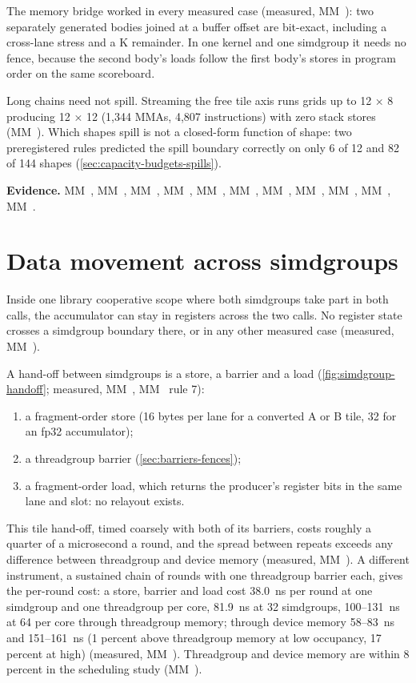 The memory bridge worked in every measured case (measured, MM~): two separately generated bodies joined at a
buffer offset are bit-exact, including a cross-lane stress and a K remainder. In one kernel and one simdgroup it needs
no fence, because the second body's loads follow the first body's stores in program order on the same scoreboard.

Long chains need not spill. Streaming the free tile axis runs grids up to 12 × 8 producing 12 × 12 (1,344 MMAs, 4,807
instructions) with zero stack stores (MM~). Which shapes spill is not a closed-form function of shape: two
preregistered rules predicted the spill boundary correctly on only 6 of 12 and 82 of 144 shapes
(\cref{sec:capacity-budgets-spills}).

\textbf{Evidence.} MM~, MM~, MM~, MM~, MM~, MM~, MM~, MM~, MM~, MM~,
MM~.

\section{Data movement across simdgroups}\label{sec:across-simdgroups}

Inside one library cooperative scope where both simdgroups take part in both calls, the accumulator can stay in
registers across the two calls. No register state crosses a simdgroup boundary there, or in any other measured case
(measured, MM~).

A hand-off between simdgroups is a store, a barrier and a load (\cref{fig:simdgroup-handoff}; measured, MM~,
MM~ rule 7):



\begin{enumerate}
\def\labelenumi{\arabic{enumi}.}
\item a fragment-order store (16 bytes per lane for a converted A or B tile, 32 for an fp32 accumulator);
\item a threadgroup barrier (\cref{sec:barriers-fences});
\item a fragment-order load, which returns the producer's register bits in the same lane and slot: no relayout exists.
\end{enumerate}

This tile hand-off, timed coarsely with both of its barriers, costs roughly a quarter of a microsecond a round, and the
spread between repeats exceeds any difference between threadgroup and device memory (measured, MM~). A different
instrument, a sustained chain of rounds with one threadgroup barrier each, gives the per-round cost: a store, barrier and
load cost 38.0~ns per round at one simdgroup and one threadgroup per core, 81.9~ns at 32 simdgroups, 100–131~ns at 64 per core
through threadgroup memory; through device memory 58–83~ns and 151–161~ns (1 percent above threadgroup memory at low
occupancy, 17 percent at high) (measured, MM~). Threadgroup and device memory are within 8 percent in the scheduling
study (MM~).


